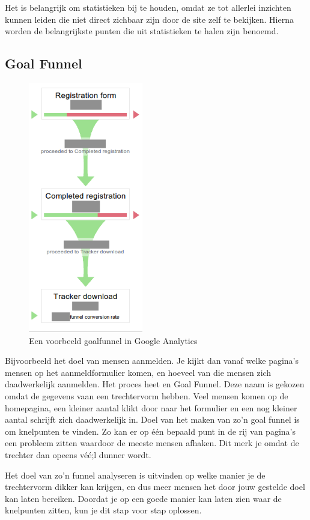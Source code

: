 \documentclass[a4paper, 10pt, pdftex]{report}
\begin{document}
    Het is belangrijk om statistieken bij te houden, omdat ze tot allerlei inzichten kunnen leiden die niet direct zichbaar zijn door de site zelf te bekijken. Hierna worden de belangrijkste punten die uit statistieken te halen zijn benoemd.

    \subsection{Goal Funnel}
      \begin{figure}
      \caption{Een voorbeeld goalfunnel in Google Analytics}
        \includegraphics[width=50mm]{../images/goalfunnel}
    \end{figure}

    Bijvoorbeeld het doel van mensen aanmelden. Je kijkt dan vanaf welke pagina's mensen op het aanmeldformulier komen, en hoeveel van die mensen zich daadwerkelijk aanmelden. Het proces heet en Goal Funnel. Deze naam is gekozen omdat de gegevens vaan een trechtervorm hebben. Veel mensen komen op de homepagina, een kleiner aantal klikt door naar het formulier en een nog kleiner aantal schrijft zich daadwerkelijk in. Doel van het maken van zo'n goal funnel is om knelpunten te vinden. Zo kan er op \'e\'en bepaald punt in de rij van pagina's een probleem zitten waardoor de meeste mensen afhaken. Dit merk je omdat de trechter dan opeens v\'e\'e;l dunner wordt.

    Het doel van zo'n funnel analyseren is uitvinden op welke manier je de trechtervorm dikker kan krijgen, en dus meer mensen het door jouw gestelde doel kan laten bereiken. Doordat je op een goede manier kan laten zien waar de knelpunten zitten, kun je dit stap voor stap oplossen.
\end{document}
